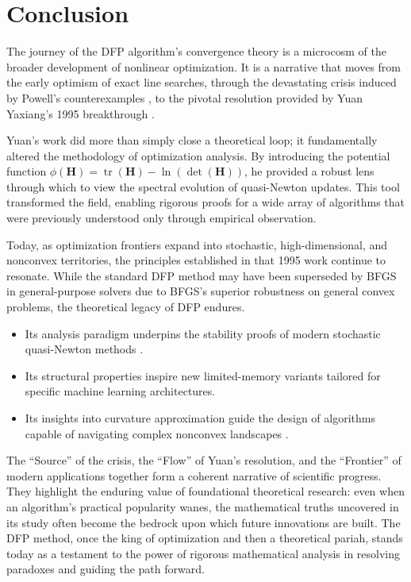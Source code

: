 \documentclass[12pt,a4paper]{article}  %
\newcounter{cite}
\theoremstyle{definition}
\numberwithin{equation}{section}
\DeclareMathOperator{\tr}{tr}
\begin{document}
\section{Conclusion}
\label{sec:conclusion}

The journey of the DFP algorithm's convergence theory is a microcosm of the broader development of nonlinear optimization. It is a narrative that moves from the early optimism of exact line searches, through the devastating crisis induced by Powell's counterexamples \cite{powell1984,powell1986}, to the pivotal resolution provided by Yuan Yaxiang's 1995 breakthrough \cite{yuan1995}.

Yuan's work \cite{yuan1995} did more than simply close a theoretical loop; it fundamentally altered the methodology of optimization analysis. By introducing the potential function $\phi(\mathbf{H}) = \tr(\mathbf{H}) - \ln(\det(\mathbf{H}))$, he provided a robust lens through which to view the spectral evolution of quasi-Newton updates. This tool transformed the field, enabling rigorous proofs for a wide array of algorithms that were previously understood only through empirical observation.

Today, as optimization frontiers expand into stochastic, high-dimensional, and nonconvex territories, the principles established in that 1995 work continue to resonate. While the standard DFP method may have been superseded by BFGS in general-purpose solvers due to BFGS's superior robustness on general convex problems, the theoretical legacy of DFP endures.
\begin{itemize}
    \item Its analysis paradigm underpins the stability proofs of modern stochastic quasi-Newton methods \cite{byrd2016, moritz2016}.
    \item Its structural properties inspire new limited-memory variants tailored for specific machine learning architectures.
    \item Its insights into curvature approximation guide the design of algorithms capable of navigating complex nonconvex landscapes \cite{li2001}.
\end{itemize}

The ``Source'' of the crisis, the ``Flow'' of Yuan's resolution, and the ``Frontier'' of modern applications together form a coherent narrative of scientific progress. They highlight the enduring value of foundational theoretical research: even when an algorithm's practical popularity wanes, the mathematical truths uncovered in its study often become the bedrock upon which future innovations are built. The DFP method, once the king of optimization and then a theoretical pariah, stands today as a testament to the power of rigorous mathematical analysis in resolving paradoxes and guiding the path forward.
\end{document}
